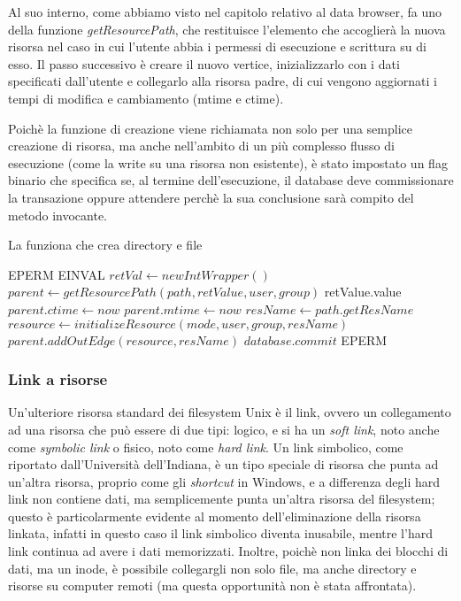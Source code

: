 Al suo interno, come abbiamo visto nel capitolo relativo al data browser, fa uno della funzione \emph{getResourcePath}, che restituisce l'elemento che accoglierà la nuova risorsa nel caso in cui l'utente abbia i permessi di esecuzione e scrittura su di esso. Il passo successivo è creare il nuovo vertice, inizializzarlo con i dati specificati dall'utente e collegarlo alla risorsa padre, di cui vengono aggiornati i tempi di modifica e cambiamento (mtime e ctime).

Poichè la funzione di creazione viene richiamata non solo per una semplice creazione di risorsa, ma anche nell'ambito di un più complesso flusso di esecuzione (come la write su una risorsa non esistente), è stato impostato un flag binario che specifica se, al termine dell'esecuzione, il database deve commissionare la transazione oppure attendere perchè la sua conclusione sarà compito del metodo invocante.
\begin{algorithm}
\begin{algorithmic}[5]
\caption{La funziona che crea directory e file}
		\State \Return EPERM
	\EndIf
		\State \Return EINVAL
	\EndIf
	\State $retVal \gets new IntWrapper()$
	\State $parent \gets getResourcePath(path, retValue, user, group)$
		\State \Return retValue.value
	\EndIf
		\State $parent.ctime \gets now$
		\State $parent.mtime \gets now$
		\State $resName \gets path.getResName$
		\State $resource \gets initializeResource(mode, user, group, resName)$
		\State $parent.addOutEdge(resource, resName)$
			\State $database.commit$
		\EndIf
	\Else
		\State \Return EPERM
	\EndIf
	\State {}
\EndFunction
\end{algorithmic}
\end{algorithm}

\subsubsection{Link a risorse}
Un'ulteriore risorsa standard dei filesystem Unix è il link, ovvero un collegamento ad una risorsa che può essere di due tipi: logico, e si ha un \emph{soft link}, noto anche come \emph{symbolic link} o fisico, noto come \emph{hard link}. Un link simbolico, come riportato dall'Università dell'Indiana, %
è un tipo speciale di risorsa che punta ad un'altra risorsa, proprio come gli \emph{shortcut} in Windows, e a differenza degli hard link non contiene dati, ma semplicemente punta un'altra risorsa del filesystem; questo è particolarmente evidente al momento dell'eliminazione della risorsa linkata, infatti in questo caso il link simbolico diventa inusabile, mentre l'hard link continua ad avere i dati memorizzati. Inoltre, poichè non linka dei blocchi di dati, ma un inode, è possibile collegargli non solo file, ma anche directory e risorse su computer remoti (ma questa opportunità non è stata affrontata).

